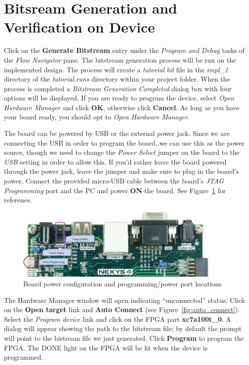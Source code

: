 \documentclass[11pt]{article}
\begin{document}
\section{Bitsream Generation and Verification on Device}
\label{sec:bitgen}
Click on the \textbf{Generate Bitstream} entry under the \textit{Program and Debug} tasks of the \textit{Flow Navigator} pane. The bitstream generation process will be run on the implemented design. The process will create a \textit{tutorial.bit} file in the \textit{impl\_1} directory of the \textit{tutorial.runs} directory within your project folder. When the process is completed a \textit{Bitstream Generation Completed} dialog box with four options will be displayed. If you are ready to program the device, select \textit{Open Hardware Manager} and click \textbf{OK}, otherwise click \textbf{Cancel}. As long as you have your board ready, you should opt to \textit{Open Hardware Manager}.

The board can be powered by USB or the external power jack. Since we are connecting the USB in order to program the board, we can use this as the power source, though we need to change the \textit{Power Select} jumper on the board to the \textit{USB} setting in order to allow this. If you'd rather leave the board powered through the power jack, leave the jumper and make sure to plug in the board's power. Connect the provided micro-USB cable between the board's \textit{JTAG Programming} port and the PC and power \textbf{ON} the board. See Figure~\ref{fig:board_power} for reference.

\begin{figure}[!h]
    \centering
    \includegraphics[width=0.9\textwidth]{images/board_power.png}
    \caption{Board power configuration and programming/power port locations}
    \label{fig:board_power}
\end{figure}

The Hardware Manager window will open indicating “unconnected” status. Click on the \textbf{Open target} link and \textbf{Auto Connect} (see Figure~\ref{fig:auto_connect}). Select the \textit{Program device} link and click on the FPGA part \textbf{xc7a100t\_0}. A dialog will appear showing the path to the bitstream file; by default the prompt will point to the bistream file we just generated. Click \textbf{Program} to program the FPGA. The DONE light on the FPGA will be lit when the device is programmed.
\end{document}
